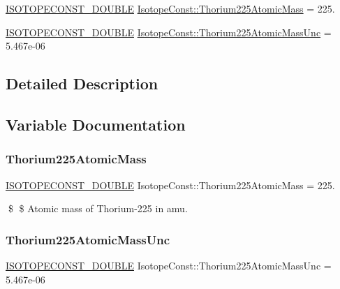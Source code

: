 \begin{DoxyCompactItemize}
\item 
\mbox{\hyperlink{group___isotope_const-_macros_ga8f45a7272ce02c0b4c65c44636ed719a}{I\+S\+O\+T\+O\+P\+E\+C\+O\+N\+S\+T\+\_\+\+D\+O\+U\+B\+LE}} \mbox{\hyperlink{group___isotope_const-_thorium-_th225_ga396527f8a5bf6111a334e9e69f56c758}{Isotope\+Const\+::\+Thorium225\+Atomic\+Mass}} = 225.
\item 
\mbox{\hyperlink{group___isotope_const-_macros_ga8f45a7272ce02c0b4c65c44636ed719a}{I\+S\+O\+T\+O\+P\+E\+C\+O\+N\+S\+T\+\_\+\+D\+O\+U\+B\+LE}} \mbox{\hyperlink{group___isotope_const-_thorium-_th225_ga8611807818d0f4e5f68e39ad53c65823}{Isotope\+Const\+::\+Thorium225\+Atomic\+Mass\+Unc}} = 5.\+467e-\/06
\end{DoxyCompactItemize}


\subsection{Detailed Description}


\subsection{Variable Documentation}
\mbox{\label{group___isotope_const-_thorium-_th225_ga396527f8a5bf6111a334e9e69f56c758}} 
\subsubsection{\texorpdfstring{Thorium225\+Atomic\+Mass}{Thorium225AtomicMass}}
{\footnotesize\ttfamily \mbox{\hyperlink{group___isotope_const-_macros_ga8f45a7272ce02c0b4c65c44636ed719a}{I\+S\+O\+T\+O\+P\+E\+C\+O\+N\+S\+T\+\_\+\+D\+O\+U\+B\+LE}} Isotope\+Const\+::\+Thorium225\+Atomic\+Mass = 225.}

\$ \$ Atomic mass of Thorium-\/225 in amu. \mbox{\label{group___isotope_const-_thorium-_th225_ga8611807818d0f4e5f68e39ad53c65823}} 
\subsubsection{\texorpdfstring{Thorium225\+Atomic\+Mass\+Unc}{Thorium225AtomicMassUnc}}
{\footnotesize\ttfamily \mbox{\hyperlink{group___isotope_const-_macros_ga8f45a7272ce02c0b4c65c44636ed719a}{I\+S\+O\+T\+O\+P\+E\+C\+O\+N\+S\+T\+\_\+\+D\+O\+U\+B\+LE}} Isotope\+Const\+::\+Thorium225\+Atomic\+Mass\+Unc = 5.\+467e-\/06}


